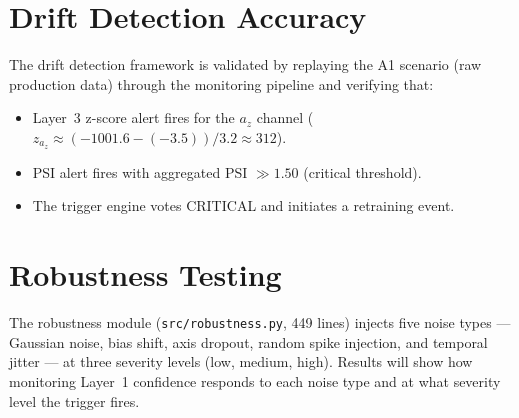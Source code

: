 \section{Drift Detection Accuracy}
\label{sec:drift_detection}


The drift detection framework is validated by replaying the A1 scenario
(raw production data) through the monitoring pipeline and verifying that:
\begin{itemize}
  \item Layer~3 z-score alert fires for the $a_z$ channel
        ($z_{a_z} \approx (−1001.6 − (−3.5))/3.2 \approx 312$).
  \item PSI alert fires with aggregated PSI $\gg 1.50$ (critical threshold).
  \item The trigger engine votes CRITICAL and initiates a retraining event.
\end{itemize}

\section{Robustness Testing}
\label{sec:robustness}


The robustness module (\texttt{src/robustness.py}, 449 lines) injects five
noise types --- Gaussian noise, bias shift, axis dropout, random spike
injection, and temporal jitter --- at three severity levels (low, medium, high).
Results will show how monitoring Layer~1 confidence responds to each noise type
and at what severity level the trigger fires.

